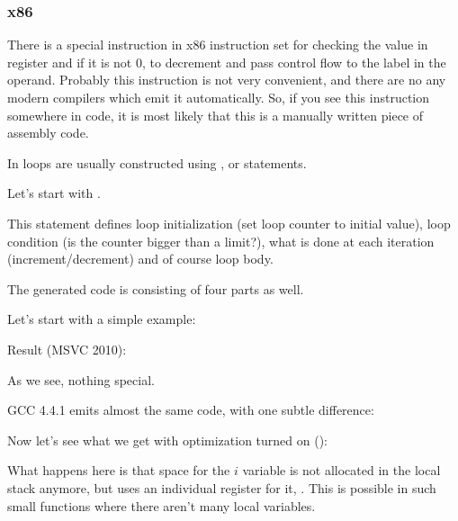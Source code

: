 \subsubsection{x86}


There is a special \LOOP instruction in x86 instruction set for checking the value in register \ECX and 
if it is not 0, to \gls{decrement} \ECX
and pass control flow to the label in the \LOOP operand. 
Probably this instruction is not very convenient, and there are no any modern compilers which emit it automatically.
So, if you see this instruction somewhere in code, it is most likely that this is a manually written piece 
of assembly code.

\par

In \CCpp loops are usually constructed using ,  or  statements.

Let's start with .

This statement defines loop initialization (set loop counter to initial value), 
loop condition (is the counter bigger than a limit?), what is done at each iteration (\gls{increment}/\gls{decrement})
and of course loop body.



The generated code is consisting of four parts as well.

Let's start with a simple example:



Result (MSVC 2010):



As we see, nothing special.

GCC 4.4.1 emits almost the same code, with one subtle difference:



Now let's see what we get with optimization turned on (\TT{\Ox}):



What happens here is that space for the $i$ variable is not allocated in the local stack anymore,
but uses an individual register for it, \ESI.
This is possible in such small functions where there aren't many local variables.

